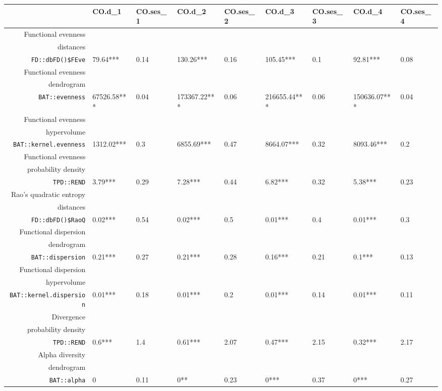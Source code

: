 \begin{table}[ht]
\scriptsize
\centering
\begin{tabular}{rllllllll}
  \hline
 & CO.d\_1 & CO.ses\_1 & CO.d\_2 & CO.ses\_2 & CO.d\_3 & CO.ses\_3 & CO.d\_4 & CO.ses\_4 \\ 
  \hline
Functional evenness\\distances\\\texttt{FD::dbFD()\$FEve} & 79.64*** & 0.14 & 130.26*** & 0.16 & 105.45*** & 0.1 & 92.81*** & 0.08 \\ 
  Functional evenness\\dendrogram\\\texttt{BAT::evenness} & 67526.58*** & 0.04 & 173367.22*** & 0.06 & 216655.44*** & 0.06 & 150636.07*** & 0.04 \\ 
  Functional evenness\\hypervolume\\\texttt{BAT::kernel.evenness} & 1312.02*** & 0.3 & 6855.69*** & 0.47 & 8664.07*** & 0.32 & 8093.46*** & 0.2 \\ 
  Functional evenness\\probability density\\\texttt{TPD::REND} & 3.79*** & 0.29 & 7.28*** & 0.44 & 6.82*** & 0.32 & 5.38*** & 0.23 \\ 
  Rao's quadratic entropy\\distances\\\texttt{FD::dbFD()\$RaoQ} & 0.02*** & 0.54 & 0.02*** & 0.5 & 0.01*** & 0.4 & 0.01*** & 0.3 \\ 
  Functional dispersion\\dendrogram\\\texttt{BAT::dispersion} & 0.21*** & 0.27 & 0.21*** & 0.28 & 0.16*** & 0.21 & 0.1*** & 0.13 \\ 
  Functional dispersion\\hypervolume\\\texttt{BAT::kernel.dispersion} & 0.01*** & 0.18 & 0.01*** & 0.2 & 0.01*** & 0.14 & 0.01*** & 0.11 \\ 
  Divergence\\probability density\\\texttt{TPD::REND} & 0.6*** & 1.4 & 0.61*** & 2.07 & 0.47*** & 2.15 & 0.32*** & 2.17 \\ 
  Alpha diversity\\dendrogram\\\texttt{BAT::alpha} & 0 & 0.11 & 0** & 0.23 & 0*** & 0.37 & 0*** & 0.27 \\ 

\end{tabular}
\end{table}
